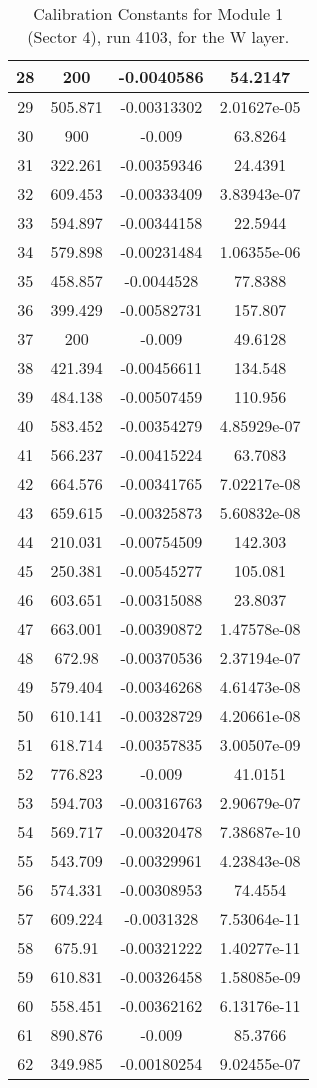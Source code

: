 \begin{table}[h]
{\begin{tabular}{|c|c|c|c|}
28	&	200	&	-0.0040586	&	54.2147	\\	\hline
29	&	505.871	&	-0.00313302	&	2.01627e-05	\\	\hline
30	&	900	&	-0.009	&	63.8264	\\	\hline
31	&	322.261	&	-0.00359346	&	24.4391	\\	\hline
32	&	609.453	&	-0.00333409	&	3.83943e-07	\\	\hline
33	&	594.897	&	-0.00344158	&	22.5944	\\	\hline
34	&	579.898	&	-0.00231484	&	1.06355e-06	\\	\hline
35	&	458.857	&	-0.0044528	&	77.8388	\\	\hline
36	&	399.429	&	-0.00582731	&	157.807	\\	\hline
37	&	200	&	-0.009	&	49.6128	\\	\hline
38	&	421.394	&	-0.00456611	&	134.548	\\	\hline
39	&	484.138	&	-0.00507459	&	110.956	\\	\hline
40	&	583.452	&	-0.00354279	&	4.85929e-07	\\	\hline
41	&	566.237	&	-0.00415224	&	63.7083	\\	\hline
42	&	664.576	&	-0.00341765	&	7.02217e-08	\\	\hline
43	&	659.615	&	-0.00325873	&	5.60832e-08	\\	\hline
44	&	210.031	&	-0.00754509	&	142.303	\\	\hline
45	&	250.381	&	-0.00545277	&	105.081	\\	\hline
46	&	603.651	&	-0.00315088	&	23.8037	\\	\hline
47	&	663.001	&	-0.00390872	&	1.47578e-08	\\	\hline
48	&	672.98	&	-0.00370536	&	2.37194e-07	\\	\hline
49	&	579.404	&	-0.00346268	&	4.61473e-08	\\	\hline
50	&	610.141	&	-0.00328729	&	4.20661e-08	\\	\hline
51	&	618.714	&	-0.00357835	&	3.00507e-09	\\	\hline
52	&	776.823	&	-0.009	&	41.0151	\\	\hline
53	&	594.703	&	-0.00316763	&	2.90679e-07	\\	\hline
54	&	569.717	&	-0.00320478	&	7.38687e-10	\\	\hline
55	&	543.709	&	-0.00329961	&	4.23843e-08	\\	\hline
56	&	574.331	&	-0.00308953	&	74.4554	\\	\hline
57	&	609.224	&	-0.0031328	&	7.53064e-11	\\	\hline
58	&	675.91	&	-0.00321222	&	1.40277e-11	\\	\hline
59	&	610.831	&	-0.00326458	&	1.58085e-09	\\	\hline
60	&	558.451	&	-0.00362162	&	6.13176e-11	\\	\hline
61	&	890.876	&	-0.009	&	85.3766	\\	\hline
62	&	349.985	&	-0.00180254	&	9.02455e-07	\\	\hline
        \end{tabular}
        }
        \caption{Calibration Constants for Module 1 (Sector 4), run 4103, for the W layer.}
\end{table}

